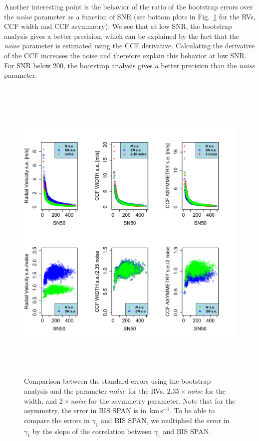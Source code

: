 \documentclass[11pt, oneside]{article}
\def\kms{\hbox{\,km\,s$^{-1}$}}       %
\begin{document}
Another interesting point is the behavior of the ratio of the bootstrap errors over the \emph{noise} parameter as a function of SNR (see bottom plots in Fig.~\ref{fig:se} for the RVs, CCF width and CCF asymmetry). We see that at low SNR, the bootstrap analysis gives a better precision, which can be explained by the fact that the \emph{noise} parameter is estimated using the CCF derivative. Calculating the derivative of the CCF increases the noise and therefore explain this behavior at low SNR. For SNR below 200, the bootstrap analysis gives a better precision than the \emph{noise} parameter.
%
\begin{figure}[htbp]
   \centering
\includegraphics[height = 6in]{[5]Errors_vs_SNR_all_stars.pdf} 
   \caption{Comparison between the standard errors using the bootstrap analysis and the parameter $noise$ for the RVs, $2.35\times$\emph{noise} for the width, and $2\times$\emph{noise} for the asymmetry parameter. Note that for the asymmetry, the error in BIS SPAN is in \kms. To be able to compare the errors in $\gamma_1$ and BIS SPAN, we multiplied the error in $\gamma_1$ by the slope of the correlation between $\gamma_1$ and BIS SPAN.}
   \label{fig:se}
\end{figure}
\end{document}
